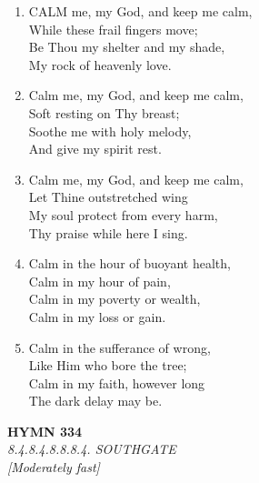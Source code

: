 \documentclass[11pt,a4paper]{article}
\begin{document}
\begin{enumerate}
    \item CALM me, my God, and keep me calm, \\
        While these frail fingers move; \\
        Be Thou my shelter and my shade, \\
        My rock of heavenly love.

    \item Calm me, my God, and keep me calm, \\
        Soft resting on Thy breast; \\
        Soothe me with holy melody, \\
        And give my spirit rest.

    \item Calm me, my God, and keep me calm, \\
        Let Thine outstretched wing \\
        My soul protect from every harm, \\
        Thy praise while here I sing.

    \item Calm in the hour of buoyant health, \\
        Calm in my hour of pain, \\
        Calm in my poverty or wealth, \\
        Calm in my loss or gain.

    \item Calm in the sufferance of wrong, \\
        Like Him who bore the tree; \\
        Calm in my faith, however long \\
        The dark delay may be.

\end{enumerate}

\newpage
\begin{center}
    {\Large \textbf{HYMN 334}}
    \\
    \textit{8.4.8.4.8.8.8.4. SOUTHGATE}
    \\
    \textit{\small [Moderately fast]}
\end{center}
\vspace{1em}
\end{document}
